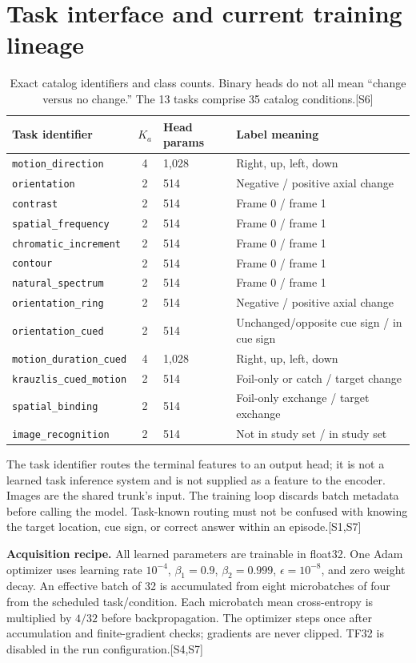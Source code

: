 \documentclass[10pt,letterpaper]{article}
\newcommand{\src}[1]{\textcolor{accent}{\textsf{[#1]}}}
\newcommand{\psection}[1]{\clearpage\section{#1}}
\begin{document}
\psection{Task interface and current training lineage}
\begin{table}[h!]
\centering\small
\begin{tabularx}{\linewidth}{@{}lclX@{}}\toprule
Task identifier & $K_a$ & Head params & Label meaning\\\midrule
\texttt{motion\_direction} &4&1,028& Right, up, left, down\\
\texttt{orientation} &2&514& Negative / positive axial change\\
\texttt{contrast} &2&514& Frame 0 / frame 1\\
\texttt{spatial\_frequency} &2&514& Frame 0 / frame 1\\
\texttt{chromatic\_increment} &2&514& Frame 0 / frame 1\\
\texttt{contour} &2&514& Frame 0 / frame 1\\
\texttt{natural\_spectrum} &2&514& Frame 0 / frame 1\\
\texttt{orientation\_ring} &2&514& Negative / positive axial change\\
\texttt{orientation\_cued} &2&514& Unchanged/opposite cue sign / in cue sign\\
\texttt{motion\_duration\_cued} &4&1,028& Right, up, left, down\\
\texttt{krauzlis\_cued\_motion} &2&514& Foil-only or catch / target change\\
\texttt{spatial\_binding} &2&514& Foil-only exchange / target exchange\\
\texttt{image\_recognition} &2&514& Not in study set / in study set\\\bottomrule
\end{tabularx}
\caption{Exact catalog identifiers and class counts. Binary heads do not all mean ``change versus no change.'' The 13 tasks comprise 35 catalog conditions.\src{S6}}
\end{table}
The task identifier routes the terminal features to an output head; it is not a learned task inference system and is not supplied as a feature to the encoder. Images are the shared trunk's input. The training loop discards batch metadata before calling the model. Task-known routing must not be confused with knowing the target location, cue sign, or correct answer within an episode.\src{S1,S7}

\textbf{Acquisition recipe.} All learned parameters are trainable in float32. One Adam optimizer \cite{adam} uses learning rate $10^{-4}$, $\beta_1=0.9$, $\beta_2=0.999$, $\epsilon=10^{-8}$, and zero weight decay. An effective batch of 32 is accumulated from eight microbatches of four from the scheduled task/condition. Each microbatch mean cross-entropy is multiplied by $4/32$ before backpropagation. The optimizer steps once after accumulation and finite-gradient checks; gradients are never clipped. TF32 is disabled in the run configuration.\src{S4,S7}
\end{document}
